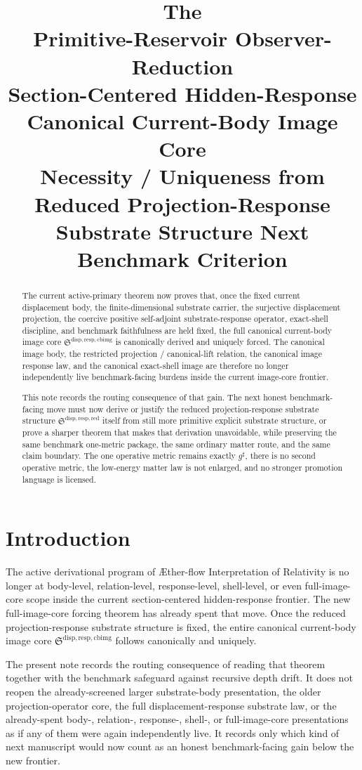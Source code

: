 \documentclass[11pt]{article}
\title{\textbf{The \TheoryName{}}\\[0.4em]
\large Primitive-Reservoir Observer-Reduction\\
\large Section-Centered Hidden-Response\\
\large Canonical Current-Body Image Core\\
\large Necessity / Uniqueness from Reduced Projection-Response\\
\large Substrate Structure Next Benchmark Criterion}
\author{}
\date{}
\newcommand{\Aflow}{\AE{}ther-flow}
\newcommand{\TheoryName}{\Aflow{} Interpretation of Relativity}
\newcommand{\CompletedMetric}{g^{\sharp}}
\newcommand{\ReducedStructure}{\mathfrak S^{\mathrm{disp,resp,red}}}
\newcommand{\CurrentBodyImageCore}{\mathfrak S^{\mathrm{disp,resp,cbimg}}}
\begin{document}
\maketitle

\begin{abstract}
The current active-primary theorem now proves that, once the fixed current displacement body, the finite-dimensional substrate carrier, the surjective displacement projection, the coercive positive self-adjoint substrate-response operator, exact-shell discipline, and benchmark faithfulness are held fixed, the full canonical current-body image core \(\CurrentBodyImageCore\) is canonically derived and uniquely forced. The canonical image body, the restricted projection / canonical-lift relation, the canonical image response law, and the canonical exact-shell image are therefore no longer independently live benchmark-facing burdens inside the current image-core frontier.

This note records the routing consequence of that gain. The next honest benchmark-facing move must now derive or justify the reduced projection-response substrate structure \(\ReducedStructure\) itself from still more primitive explicit substrate structure, or prove a sharper theorem that makes that derivation unavoidable, while preserving the same benchmark one-metric package, the same ordinary matter route, and the same claim boundary. The one operative metric remains exactly \(\CompletedMetric\), there is no second operative metric, the low-energy matter law is not enlarged, and no stronger promotion language is licensed.
\end{abstract}

\section{Introduction}

The active derivational program of \TheoryName{} is no longer at body-level, relation-level, response-level, shell-level, or even full-image-core scope inside the current section-centered hidden-response frontier. The new full-image-core forcing theorem has already spent that move. Once the reduced projection-response substrate structure is fixed, the entire canonical current-body image core \(\CurrentBodyImageCore\) follows canonically and uniquely.

The present note records the routing consequence of reading that theorem together with the benchmark safeguard against recursive depth drift. It does not reopen the already-screened larger substrate-body presentation, the older projection-operator core, the full displacement-response substrate law, or the already-spent body-, relation-, response-, shell-, or full-image-core presentations as if any of them were again independently live. It records only which kind of next manuscript would now count as an honest benchmark-facing gain below the new frontier.
\end{document}
